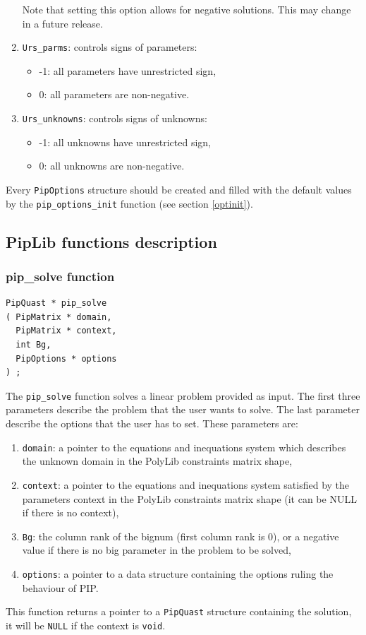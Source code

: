 \documentclass[12pt,a4paper]{article}
\begin{document}
\begin{enumerate}
      Note that setting this option allows for negative solutions.
      This may change in a future release.
\item \verb+Urs_parms+: controls signs of parameters:
	\begin{itemize}
	\item -1: all parameters have unrestricted sign,
	\item 0: all parameters are non-negative.
        \end{itemize}
\item \verb+Urs_unknowns+: controls signs of unknowns:
	\begin{itemize}
	\item -1: all unknowns have unrestricted sign,
	\item 0: all unknowns are non-negative.
        \end{itemize}
\end{enumerate}
Every {\tt PipOptions} structure should be created and filled with the default
values by the {\tt pip\_options\_init} function (see section \ref{optinit}).

\subsection{PipLib functions description}\label{PipLibfunc}
\subsubsection{pip\_solve function}
\begin{verbatim}
PipQuast * pip_solve
( PipMatrix * domain,
  PipMatrix * context,
  int Bg,
  PipOptions * options
) ;
\end{verbatim}
The {\tt pip\_solve} function solves a linear problem provided as input. The
first three parameters describe the problem that the user wants to solve.
The last parameter describe the options that the user has to set.
These parameters are:
\begin{enumerate}
\item {\tt domain}: a pointer to the equations and inequations system which
      describes the unknown domain in the PolyLib constraints matrix shape,
\item {\tt context}: a pointer to the equations and inequations system satisfied
      by the parameters context in the PolyLib constraints matrix shape
      (it can be NULL if there is no context),
\item {\tt Bg}: the column rank of the bignum (first column rank is 0), or a
      negative value if there is no big parameter in the problem to be solved, 
\item {\tt options}: a pointer to a data structure containing the options
      ruling the behaviour of PIP.
\end{enumerate}
This function returns a pointer to a {\tt PipQuast} structure containing the
solution, it will be {\tt NULL} if the context is {\tt void}.
\end{document}

